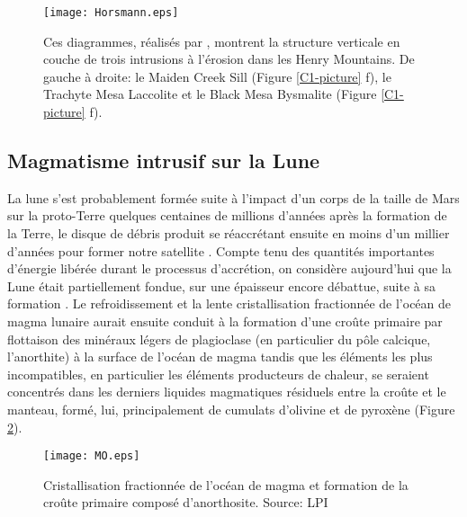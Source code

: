 \begin{figure}[htpb]
  \begin{center}
    \graphicspath{ {/Users/thorey/Documents/These/Manuscript/Figure/Chapter1/} }
    \texttt{[image: Horsmann.eps]}
    \caption{Ces  diagrammes,  réalisés  par  \citet{Horsman:2009gea},
      montrent la structure verticale en  couche de trois intrusions à
      l'érosion  dans les  Henry  Mountains. De  gauche  à droite:  le
      Maiden Creek Sill (Figure  \ref{C1-picture} f), le Trachyte Mesa
      Laccolite et  le Black  Mesa Bysmalite  (Figure \ref{C1-picture}
      f).}
    \label{C1-Horsmann}
  \end{center}
\end{figure}

\subsection{Magmatisme intrusif sur la Lune}
\label{C1-sec:moon}

La lune  s'est probablement formée suite  à l'impact d'un corps  de la
taille  de Mars  sur  la proto-Terre  quelques  centaines de  millions
d'années après la  formation de la Terre, le disque  de débris produit
se  réaccrétant ensuite  en moins  d'un millier  d'années pour  former
notre                                                        satellite
\citep{Mizutani:1972hc,Cameron:1991vu,Canup:2001eb,Canup:2012cd}.
Compte  tenu des  quantités  importantes d'énergie  libérée durant  le
processus  d'accrétion, on  considère  aujourd'hui que  la Lune  était
partiellement fondue,  sur une épaisseur  encore débattue, suite  à sa
formation \citep{ElkinsTanton:2011ce}.  Le refroidissement et la lente
cristallisation fractionnée de l'océan de magma lunaire aurait ensuite
conduit  à  la formation  d'une  croûte  primaire par  flottaison  des
minéraux  légers  de plagioclase  (en  particulier  du pôle  calcique,
l'anorthite) à la surface de l'océan  de magma tandis que les éléments
les  plus incompatibles,  en particulier  les éléments  producteurs de
chaleur, se seraient concentrés dans les derniers liquides magmatiques
résiduels entre la croûte et le manteau, formé, lui, principalement de
cumulats d'olivine et de pyroxène (Figure \ref{C1-MO}).

\begin{figure}[htpb]
  \begin{center}
    \graphicspath{ {/Users/thorey/Documents/These/Manuscript/Figure/Chapter1/} }
    \texttt{[image: MO.eps]}
    \caption{Cristallisation  fractionnée  de   l'océan  de  magma  et
      formation de  la croûte primaire composé  d'anorthosite. Source:
      LPI}
    \label{C1-MO}
  \end{center}
\end{figure}

